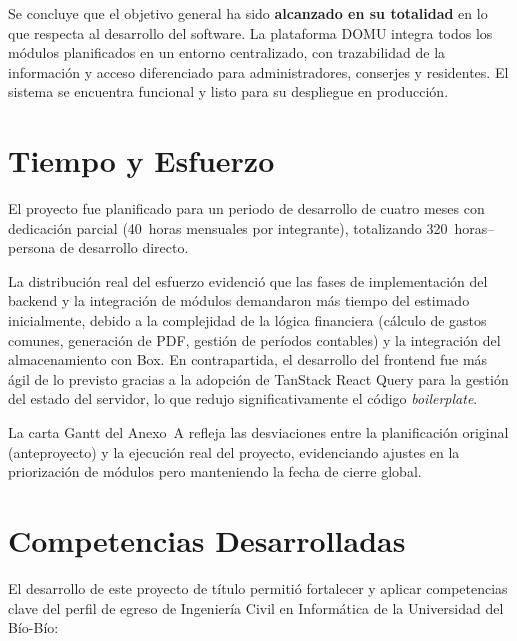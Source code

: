 Se concluye que el objetivo general ha sido \textbf{alcanzado en su totalidad} en lo que respecta al desarrollo del software. La plataforma DOMU integra todos los módulos planificados en un entorno centralizado, con trazabilidad de la información y acceso diferenciado para administradores, conserjes y residentes. El sistema se encuentra funcional y listo para su despliegue en producción.

\section{Tiempo y Esfuerzo}

El proyecto fue planificado para un periodo de desarrollo de cuatro meses con dedicación parcial (40~horas mensuales por integrante), totalizando 320~horas--persona de desarrollo directo.

La distribución real del esfuerzo evidenció que las fases de implementación del backend y la integración de módulos demandaron más tiempo del estimado inicialmente, debido a la complejidad de la lógica financiera (cálculo de gastos comunes, generación de PDF, gestión de períodos contables) y la integración del almacenamiento con Box. En contrapartida, el desarrollo del frontend fue más ágil de lo previsto gracias a la adopción de TanStack React Query para la gestión del estado del servidor, lo que redujo significativamente el código \textit{boilerplate}.

La carta Gantt del Anexo~A refleja las desviaciones entre la planificación original (anteproyecto) y la ejecución real del proyecto, evidenciando ajustes en la priorización de módulos pero manteniendo la fecha de cierre global.

\section{Competencias Desarrolladas}

El desarrollo de este proyecto de título permitió fortalecer y aplicar competencias clave del perfil de egreso de Ingeniería Civil en Informática de la Universidad del Bío-Bío:

